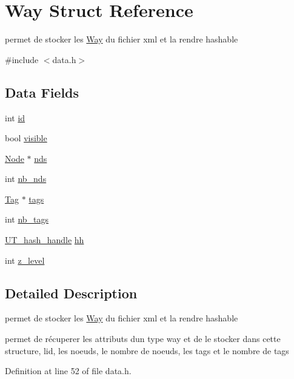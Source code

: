 \hypertarget{struct_way}{}\section{Way Struct Reference}
\label{struct_way}


permet de stocker les \hyperlink{struct_way}{Way} du fichier xml et la rendre hashable  




{\ttfamily \#include $<$data.\+h$>$}

\subsection*{Data Fields}
\begin{DoxyCompactItemize}
\item 
int \hyperlink{struct_way_a7441ef0865bcb3db9b8064dd7375c1ea}{id}
\item 
bool \hyperlink{struct_way_aa54a57ae048476d840caf6d4d2c47aa3}{visible}
\item 
\hyperlink{struct_node}{Node} $\ast$ \hyperlink{struct_way_aeda4fa95d94e394e147ebf2bfe497071}{nds}
\item 
int \hyperlink{struct_way_a2a8e25be588f6da164fe5fea4040d76c}{nb\+\_\+nds}
\item 
\hyperlink{struct_tag}{Tag} $\ast$ \hyperlink{struct_way_a5b3cb60eeefcbc271683754bf243aebb}{tags}
\item 
int \hyperlink{struct_way_a5090182abe45c6d1577adb6c195378f3}{nb\+\_\+tags}
\item 
\hyperlink{struct_u_t__hash__handle}{U\+T\+\_\+hash\+\_\+handle} \hyperlink{struct_way_a67d3d81a4f9a9622b0befade8d131661}{hh}
\item 
int \hyperlink{struct_way_a683100657070e5df2de8d2c6398f7394}{z\+\_\+level}
\end{DoxyCompactItemize}


\subsection{Detailed Description}
permet de stocker les \hyperlink{struct_way}{Way} du fichier xml et la rendre hashable 

permet de récuperer les attributs d\textquotesingle{}un type way et de le stocker dans cette structure, l\textquotesingle{}id, les noeuds, le nombre de noeuds, les tags et le nombre de tags 

Definition at line 52 of file data.\+h.



